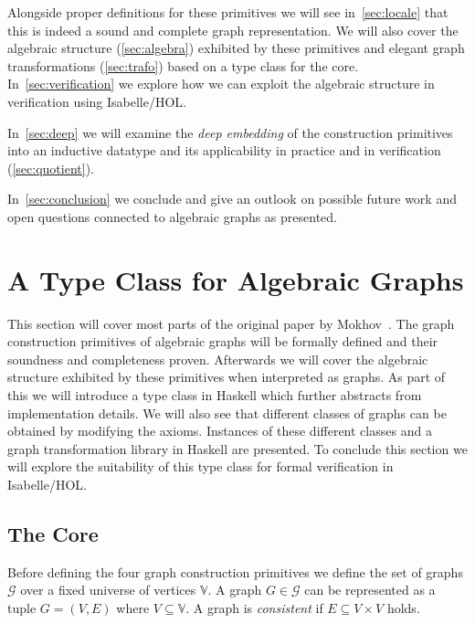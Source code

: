 \documentclass{article}
\begin{document}
Alongside proper definitions for these primitives we will see
in~\autoref{sec:locale} that this is indeed a sound and complete graph
representation. We will also cover the algebraic structure (\ref{sec:algebra})
exhibited by these primitives and elegant graph transformations (\ref{sec:trafo})
based on a type class for the core. In~\autoref{sec:verification} we explore how
we can exploit the algebraic structure in verification using Isabelle/HOL.

In~\autoref{sec:deep} we will examine the \emph{deep embedding} of the construction
primitives into an inductive datatype and its
applicability in practice and in verification (\ref{sec:quotient}). 

In~\autoref{sec:conclusion} we conclude and give an outlook on possible future
work and open questions connected to algebraic graphs as presented.

\section{A Type Class for Algebraic Graphs}\label{sec:locale}
This section will cover most parts of the original paper by
Mokhov~\cite{mokhov2017algebraic}. The graph construction primitives of
algebraic graphs will be formally defined and their soundness and completeness
proven. Afterwards we will cover the algebraic structure exhibited by these
primitives when interpreted as graphs. As part of this we will introduce a type class in Haskell which
further abstracts from implementation details. We will also see that different
classes of graphs can be obtained by modifying the axioms. Instances of
these different classes and a graph transformation library in Haskell are
presented. To conclude this section we will explore the suitability of this type
class for formal verification in Isabelle/HOL.

\subsection{The Core}\label{sec:core}
Before defining the four graph construction primitives we define the set of
graphs $\mathcal{G}$ over a fixed universe of vertices $\mathbb{V}$. A graph $G
\in \mathcal{G}$ can be represented as a tuple $G=(V,E)$ where $V \subseteq
\mathbb{V}$. A graph is \emph{consistent} if $E \subseteq V \times V$ holds.
\end{document}
